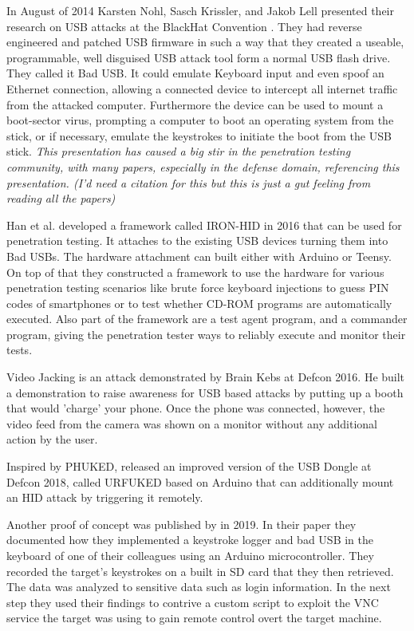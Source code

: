 In August of 2014 Karsten Nohl, Sasch Krissler, and Jakob Lell presented their research on USB attacks at the BlackHat Convention \cite{Srlabsbadusbblackhatv1Pdf2014}. They had reverse engineered and patched USB firmware in such a way that they created a useable, programmable, well disguised USB attack tool form a normal USB flash drive. They called it Bad USB. It could emulate Keyboard input and even spoof an Ethernet connection, allowing a connected device to intercept all internet traffic from the attacked computer. Furthermore the device can be used to mount a boot-sector virus, prompting a computer to boot an operating system from the stick, or if necessary, emulate the keystrokes to initiate the boot from the USB stick. \textit{This presentation has caused a big stir in the penetration testing community, with many papers, especially in the defense domain, referencing this presentation. (I'd need a citation for this but this is just a gut feeling from reading all the papers)}

Han et al.\cite{hanIRONHIDCreateYour2016} developed a framework called IRON-HID in 2016 that can be used for penetration testing. It attaches to the existing USB devices turning them into Bad USBs. The hardware attachment can built either with Arduino or Teensy. On top of that they constructed a framework to use the hardware for various penetration testing scenarios like brute force keyboard injections to guess PIN codes of smartphones or to test whether CD-ROM programs are automatically executed. Also part of the framework are a test agent program, and a commander program, giving the penetration tester ways to reliably execute and monitor their tests.   

Video Jacking is an attack demonstrated by Brain Kebs \cite{RoadWarriorsBeware2016} at Defcon 2016. He built a demonstration to raise awareness for USB based attacks by putting up a booth that would 'charge' your phone. Once the phone was connected, however, the video feed from the camera was shown on a monitor without any additional action by the user. 

Inspired by PHUKED, \cite{elkinsHackingHardwareIntroducing} released an improved version of the USB Dongle at Defcon 2018, called URFUKED 
based on Arduino that can additionally mount an HID attack by triggering it remotely.  

Another proof of concept was published by \cite{bojovicRisingThreatHardware2019} in 2019. In their paper they documented how they implemented a keystroke logger and bad USB in the keyboard of one of their colleagues using an Arduino microcontroller. They recorded the target's keystrokes on a built in SD card that they then retrieved. The data was analyzed to sensitive data such as login information. In the next step they used their findings to contrive a custom script to exploit the VNC service the target was using to gain remote control overt the target machine. 


